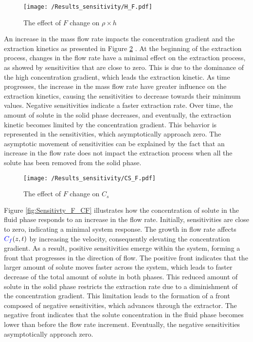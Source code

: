 \documentclass[../Article_Model_Parameters.tex]{subfiles}
\begin{document}
    \begin{figure}[h!]
    	\centering
    	\texttt{[image: /Results\_sensitivity/H\_F.pdf]}
    	\caption{The effect of $F$ change on $\rho \times h$}
    	\label{fig:Sensitivty_F_H}
    \end{figure}
   
   An increase in the mass flow rate impacts the concentration gradient and the extraction kinetics as presented in Figure \ref{fig:Sensitivty_F_CS} . At the beginning of the extraction process, changes in the flow rate have a minimal effect on the extraction process, as showed by sensitivities that are close to zero. This is due to the dominance of the high concentration gradient, which leads the extraction kinetic. As time progresses, the increase in the mass flow rate have greater influence on the extraction kinetics, causing the sensitivities to decrease towards their minimum values. Negative sensitivities indicate a faster extraction rate. Over time, the amount of solute in the solid phase decreases, and eventually, the extraction kinetic becomes limited by the concentration gradient. This behavior is represented in the sensitivities, which asymptotically approach zero. The asymptotic movement of sensitivities can be explained by the fact that an increase in the flow rate does not impact the extraction process when all the solute has been removed from the solid phase.
    
    \begin{figure}[h!]
    	\centering
    	\texttt{[image: /Results\_sensitivity/CS\_F.pdf]}
    	\caption{The effect of $F$ change on $C_s$}
    	\label{fig:Sensitivty_F_CS}
    \end{figure}
    
    Figure \ref{fig:Sensitivty_F_CF} illustrates how the concentration of solute in the fluid phase responds to an increase in the flow rate. Initially, sensitivities are close to zero, indicating a minimal system response. The growth in flow rate affects ${\color{blue}C_f}(z,t)$ by increasing the velocity, consequently elevating the concentration gradient. As a result, positive sensitivities emerge within the system, forming a front that progresses in the direction of flow. The positive front indicates that the larger amount of solute moves faster across the system, which leads to faster decrease of the total amount of solute in both phases. This reduced amount of solute in the solid phase restricts the extraction rate due to a diminishment of the concentration gradient. This limitation leads to the formation of a front composed of negative sensitivities, which advances through the extractor. The negative front indicates that the solute concentration in the fluid phase becomes lower than before the flow rate increment. Eventually, the negative sensitivities asymptotically approach zero.
    
\end{document}
